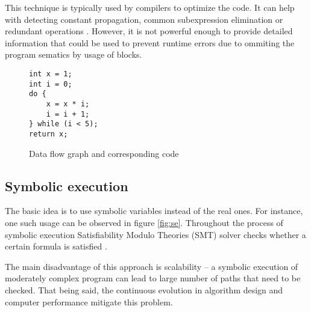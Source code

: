 \documentclass[12pt,final,oneside]{fithesis2}
\theoremstyle{definition}
\begin{document}
This technique is typically used by compilers to optimize the code. It
can help with detecting constant propagation, common subexpression
elimination or redundant operations \cite{Kildall73-1}. However, it is
not powerful enough to provide detailed information that could be used
to prevent runtime errors due to ommiting the program sematics by usage
of blocks.

\begin{figure}[ht]
\begin{minipage}{0.3\textwidth}
\begin{lstlisting}
int x = 1;
int i = 0;
do {
    x = x * i;
    i = i + 1;
} while (i < 5);
return x;
\end{lstlisting}
\end{minipage}
\begin{minipage}{0.7\textwidth}
\centering
{}
\end{minipage}
\caption{Data flow graph and corresponding code}
\label{fig:dfg}
\end{figure}


\subsection{Symbolic execution}

The basic idea is to use symbolic variables instead of the real ones.
For instance, one such usage can be observed in figure \ref{fig:se}.
Throughout the process of symbolic execution Satisfiability Modulo Theories
(SMT) solver checks whether a certain formula is satisfied \cite{Cadar11-1}.

The main disadvantage of this approach is scalability -- a symbolic
execution of moderately complex program can lead to large number of paths
that need to be checked. That being said, the continuous evolution in
algorithm design and computer performance mitigate this problem.
\end{document}
